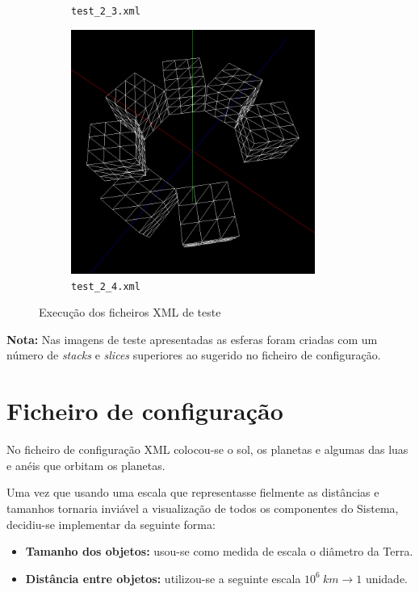 \documentclass[11pt,a4paper]{report}
\begin{document}
\begin{figure}[H]
\begin{subfigure}{0.5\textwidth}
  \caption{\texttt{test\_2\_3.xml}}
  \label{fig:snowman}
\end{subfigure}%
\begin{subfigure}{0.5\textwidth}
  \centering
  \includegraphics[width = 8cm,height = 8cm]{boxes.png}
  \caption{\texttt{test\_2\_4.xml}}
  \label{fig:sboxes}
\end{subfigure}
\label{fig:plano}
\caption{Execução dos ficheiros XML de teste}
\end{figure}
\textbf{Nota:} Nas imagens de teste apresentadas as esferas foram criadas com um número de \textit{stacks} e \textit{slices} superiores ao sugerido no ficheiro de configuração.


\newpage
\section{Ficheiro de configuração}
No ficheiro de configuração XML colocou-se o sol, os planetas e algumas das luas e anéis que orbitam os planetas. 

Uma vez que usando uma escala que representasse fielmente as distâncias e tamanhos tornaria inviável a visualização de todos os componentes do Sistema, decidiu-se implementar da seguinte forma:

\begin{itemize}
    \item \textbf{Tamanho dos objetos:} usou-se como medida de escala o diâmetro da Terra.
    \item \textbf{Distância entre objetos:} utilizou-se a seguinte escala $10^6 \ km \rightarrow 1$ unidade.
\end{itemize}
\end{document}
